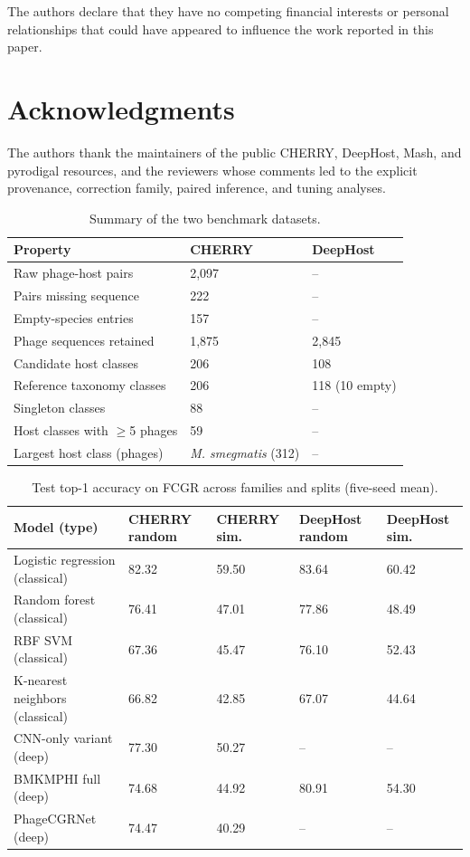 \documentclass[utf8]{FrontiersinVancouver}
\begin{document}
The authors declare that they have no competing financial interests or personal relationships that could have appeared to influence the work reported in this paper.

\section*{Acknowledgments}

The authors thank the maintainers of the public CHERRY, DeepHost, Mash, and pyrodigal resources, and the reviewers whose comments led to the explicit provenance, correction family, paired inference, and tuning analyses.


\begin{table}[ht]
\centering
\renewcommand{\arraystretch}{1.2}
\caption{Summary of the two benchmark datasets.}\label{tab:1}
\small
\begin{tabular}{l l l}
\hline
Property & CHERRY & DeepHost \\
\hline
Raw phage-host pairs & 2,097 & -- \\
Pairs missing sequence & 222 & -- \\
Empty-species entries & 157 & -- \\
Phage sequences retained & 1,875 & 2,845 \\
Candidate host classes & 206 & 108 \\
Reference taxonomy classes & 206 & 118 (10 empty) \\
Singleton classes & 88 & -- \\
Host classes with $\geq$5 phages & 59 & -- \\
Largest host class (phages) & \textit{M. smegmatis} (312) & -- \\
\hline
\end{tabular}
\end{table}

\begin{table}[ht]
\centering
\renewcommand{\arraystretch}{1.25}
\caption{Test top-1 accuracy on FCGR across families and splits (five-seed mean).}\label{tab:2}
\small
\begin{tabular}{l l l l l}
\hline
Model (type) & CHERRY random & CHERRY sim. & DeepHost random & DeepHost sim. \\
\hline
Logistic regression (classical) & 82.32 & 59.50 & 83.64 & 60.42 \\
Random forest (classical) & 76.41 & 47.01 & 77.86 & 48.49 \\
RBF SVM (classical) & 67.36 & 45.47 & 76.10 & 52.43 \\
K-nearest neighbors (classical) & 66.82 & 42.85 & 67.07 & 44.64 \\
CNN-only variant (deep) & 77.30 & 50.27 & -- & -- \\
BMKMPHI full (deep) & 74.68 & 44.92 & 80.91 & 54.30 \\
PhageCGRNet (deep) & 74.47 & 40.29 & -- & -- \\
\hline
\end{tabular}
\end{table}
\end{document}
